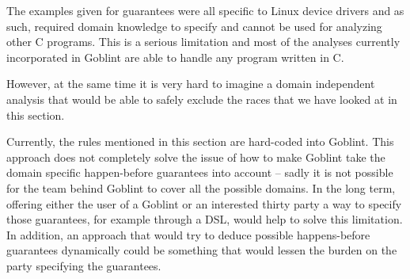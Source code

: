 \documentclass[..thesis.tex]{subfiles}
\begin{document}

The examples given for guarantees were all specific to Linux device drivers and as such, required domain knowledge to specify and cannot be used for analyzing other C programs. This is a serious limitation and most of the analyses currently incorporated in Goblint are able to handle any program written in C. 


However, at the same time it is very hard to imagine a domain independent analysis that would be able to safely exclude the races that we have looked at in this section.

Currently, the rules mentioned in this section are hard-coded into Goblint. This approach does not completely solve the issue of how to make Goblint take the domain specific happen-before guarantees into account -- sadly it is not possible for the team behind Goblint to cover all the possible domains. In the long term, offering either the user of a Goblint or an interested thirty party a way to specify those guarantees, for example through a DSL,  would help to solve this limitation. In addition, an approach that would try to deduce possible happens-before guarantees dynamically could be something that would lessen the burden on the party specifying the guarantees. 
\end{document}

